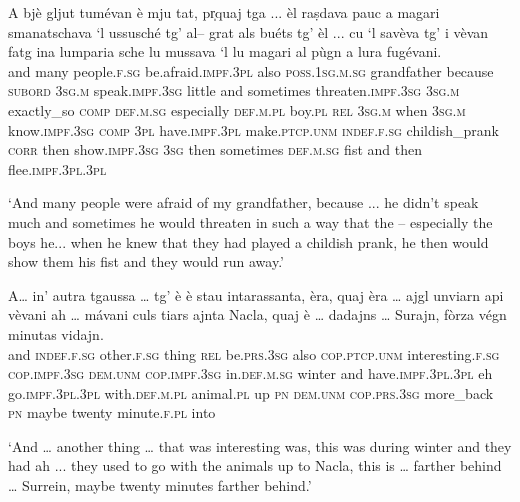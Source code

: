 \begin{linenumbers}
\gll  A bjè gljut tumévan è mju tat, pr̩quaj tga ... èl raṣdava pauc a magari smanatschava `l ussusché tg’ al– grat als buéts tg’ èl ... cu `l savèva tg’ i vèvan fatg ina lumparia sche lu mussava `l lu magari al pùgn a lura fugévani.  \\
and many people.\textsc{f.sg} be.afraid.\textsc{impf.3pl} also \textsc{poss.1sg.m.sg} grandfather because \textsc{subord} {} \textsc{3sg.m} speak.\textsc{impf.3sg} little and sometimes threaten.\textsc{impf.3sg} \textsc{3sg.m} exactly\_so \textsc{comp} \textsc{def.m.sg} especially \textsc{def.m.pl} boy.\textsc{pl} \textsc{rel} \textsc{3sg.m} {} when \textsc{3sg.m} know.\textsc{impf.3sg} \textsc{comp} \textsc{3pl} have.\textsc{impf.3pl} make.\textsc{ptcp.unm} \textsc{indef.f.sg} childish\_prank \textsc{corr} then show.\textsc{impf.3sg} \textsc{3sg} then sometimes \textsc{def.m.sg} fist and then flee.\textsc{impf.3pl.3pl} \\
\end{linenumbers}
\medskip
\glt `And many people were afraid of my grandfather, because ... he didn’t speak much and sometimes he would threaten in such a way that the – especially the boys he... when he knew that they had played a childish prank, he then would show them his fist and they would run away.'
\medskip

\begin{linenumbers}
\gll  A… in’ autra tgaussa … tg' è è stau\footnotemark{} intarassanta, èra, quaj èra … ajgl unviarn api vèvani ah … mávani culs tiars ajnta Nacla, quaj è …  dadajns … Surajn, fòrza végn minutas vidajn.    \\
and \textsc{indef.f.sg} other.\textsc{f.sg} thing {} \textsc{rel} be.\textsc{prs.3sg} also \textsc{cop.ptcp.unm} interesting.\textsc{f.sg} \textsc{cop.impf.3sg} \textsc{dem.unm} \textsc{cop.impf.3sg} {}  in.\textsc{def.m.sg} winter and have.\textsc{impf.3pl.3pl} eh {} go.\textsc{impf.3pl.3pl} with.\textsc{def.m.pl} animal.\textsc{pl} up \textsc{pn} \textsc{dem.unm} \textsc{cop.prs.3sg} {} more\_back {} \textsc{pn} maybe twenty minute.\textsc{f.pl} into\\
\end{linenumbers}
\medskip
\glt `And … another thing … that was interesting was, this was during winter and they had ah ... they used to go with the animals up to Nacla, this is … farther behind … Surrein, maybe twenty minutes farther behind.'
\medskip

